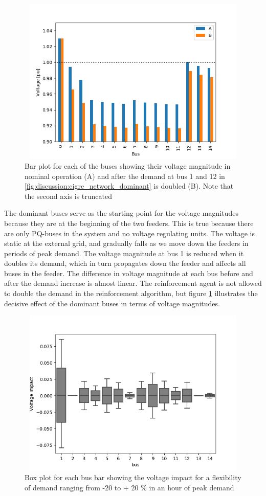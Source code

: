 \documentclass[class=book, crop=false]{standalone}
\begin{document}
\begin{figure}[h]
    \center
\includegraphics[height=8cm, width=12cm]{figures/double_large_load.png}
    \caption[size = 9]{Bar plot for each of the buses showing their voltage magnitude in nominal operation (A) and after the demand at bus 1 and 12 in \ref{fig:discussion:cigre_network_dominant} is doubled (B). Note that the second axis is truncated}
    \label{fig:discussion:double_large_load}
\end{figure}
The dominant buses serve as the starting point for the voltage magnitudes because they are at the beginning of the two feeders. This is true because there are only PQ-buses in the system and no voltage regulating units. The voltage is static at the external grid, and gradually falls as we move down the feeders in periods of peak demand. The voltage magnitude at bus 1 is reduced when it doubles its demand, which in turn propagates down the feeder and affects all buses in the feeder. The difference in voltage magnitude at each bus before and after the demand increase is almost linear. The reinforcement agent is not allowed to double the demand in the reinforcement algorithm, but figure \ref{fig:discussion:double_large_load} illustrates the decisive effect of the dominant buses in terms of voltage magnitudes.

\begin{figure}[h]
    \center
\includegraphics[height=8cm, width=12cm]{figures/voltage_impact.png}
    \caption[size = 9]{Box plot for each bus bar showing the voltage impact for a flexibility of demand ranging from -20 to + 20 \% in an hour of peak demand}
    \label{fig:discussion:voltage_impact}
\end{figure}
\end{document}
